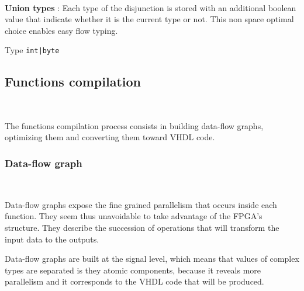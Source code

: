 \documentclass[10pt,a4paper]{article}
\newcommand{\code}{\texttt}
\renewcommand{\indent}{~\\\vspace{-.8cm}}
\begin{document}
\begin{itemize}
\begin{minipage}[H]{.8\textwidth}
\begin{figure}
			\end{figure}
			~\vspace{.02cm}
			\item \textbf{Union types} : Each type of the disjunction is stored with an additional boolean value that indicate whether it is the current type or not. This non space optimal choice enables easy flow typing.

			\begin{flushright}
			Type \code{int|byte}
			\end{flushright}
		\end{minipage}
\end{itemize}


\subsection{Functions compilation}
\indent

The functions compilation process consists in building data-flow graphs, optimizing them and converting them toward VHDL code.

\subsubsection{Data-flow graph}
\indent

Data-flow graphs expose the fine grained parallelism that occurs inside each function. They seem thus unavoidable to take advantage of the FPGA's structure. They describe the succession of operations that will transform the input data to the outputs.


Data-flow graphs are built at the signal level, which means that values of complex types are separated is they atomic components, because it reveals more parallelism and it corresponds to the VHDL code that will be produced.
\end{document}
